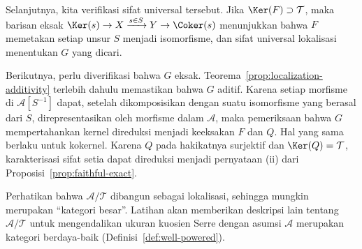 \begin{bukti}
Selanjutnya, kita verifikasi sifat universal tersebut. Jika $\Ker(F)\supset\mathcal{T}$,
maka barisan eksak $\Ker(s)\to X\xrightarrow{s\in S}Y\to\Coker(s)$
menunjukkan bahwa $F$ memetakan setiap unsur $S$ menjadi isomorfisme, dan
sifat universal lokalisasi menentukan $G$ yang dicari.

Berikutnya, perlu diverifikasi bahwa $G$ eksak.
Teorema~\ref{prop:localization-additivity} terlebih dahulu memastikan bahwa
$G$ aditif. Karena setiap morfisme di $\mathcal{A}[S^{-1}]$ dapat, setelah
dikomposisikan dengan suatu isomorfisme yang berasal dari $S$, direpresentasikan
oleh morfisme dalam $\mathcal{A}$, maka pemeriksaan bahwa $G$ mempertahankan
kernel direduksi menjadi
keeksakan $F$ dan $Q$. Hal yang sama berlaku untuk kokernel. Karena $Q$ pada
hakikatnya surjektif dan $\Ker(Q)=\mathcal{T}$, karakterisasi sifat setia dapat
direduksi menjadi pernyataan (ii) dari Proposisi~\ref{prop:faithful-exact}.
\end{bukti}
Perhatikan bahwa $\mathcal{A}/\mathcal{T}$ dibangun sebagai lokalisasi, sehingga
mungkin merupakan “kategori besar”. Latihan akan memberikan deskripsi lain
tentang $\mathcal{A}/\mathcal{T}$ untuk mengendalikan ukuran kuosien Serre
dengan asumsi $\mathcal{A}$ merupakan kategori berdaya-baik
(Definisi~\ref{def:well-powered}).

